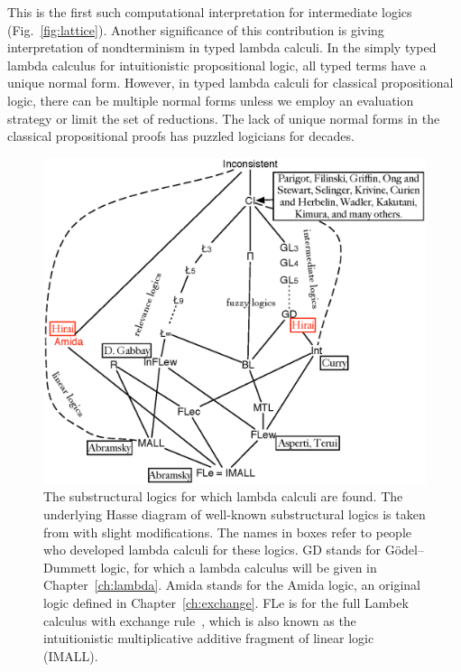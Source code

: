This is the first such computational
interpretation for intermediate logics (Fig.~\ref{fig:lattice}).
Another significance of this contribution
is giving interpretation of nondterminism in typed
lambda calculi.  In the simply typed lambda calculus for intuitionistic
propositional logic, all typed terms have a unique normal form.
However, in typed lambda calculi for classical propositional logic,
there can be multiple normal forms unless we employ an evaluation
strategy or limit the set of reductions.
The lack of unique normal forms in the classical propositional proofs
has puzzled logicians for decades. 
 \begin{figure}
  \centering
  \includegraphics[scale=0.8]{lattice.eps}
  \caption[The lattice of substructural logics, some of which with known lambda calculi.]
  {The substructural logics for which lambda calculi are found.
  The underlying Hasse diagram of well-known substructural logics is
  taken from
  \cite[p.~120]{residuated} with slight modifications.
  The names in boxes refer to people who developed lambda calculi for
  these logics.
  \textsf{GD} stands for G\"odel--Dummett logic, for which
  a lambda calculus will be given in
  Chapter~\ref{ch:lambda}.
  \textsf{Amida} stands for the Amida logic, an original logic
  defined in Chapter~\ref{ch:exchange}.
  \textsf{FLe} is for the full Lambek calculus with exchange
  rule~\citep[p.86]{residuated}, which is also known as the
  intuitionistic
  multiplicative additive fragment of linear logic (IMALL).
}
\end{figure}
